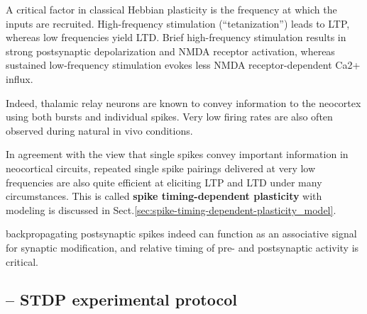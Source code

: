 A critical factor in classical Hebbian plasticity is the frequency at which the
inputs are recruited. High-frequency stimulation (``tetanization'') leads to
LTP, whereas low frequencies yield LTD. Brief high-frequency stimulation results
in strong postsynaptic depolarization and NMDA receptor activation, whereas
sustained low-frequency stimulation evokes less NMDA receptor-dependent Ca2+
influx.

Indeed, thalamic relay neurons are known to convey information to the neocortex
using both bursts and individual spikes. Very low firing rates are also often observed
during natural in vivo conditions.

In agreement with the view that single spikes convey important information in
neocortical circuits, repeated single spike pairings delivered at very low
frequencies are also quite efficient at eliciting LTP and LTD under many
circumstances. This is called {\bf spike timing-dependent plasticity} with
modeling is discussed in Sect.\ref{sec:spike-timing-dependent-plasticity_model}.

backpropagating postsynaptic spikes indeed can function as an associative signal
for synaptic modification, and relative timing of pre- and postsynaptic activity
is critical.

\subsection{-- STDP experimental protocol}
\label{sec:STDP-protocol}


